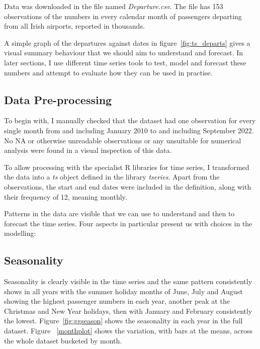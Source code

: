 \documentclass[9pt,technote]{IEEEtran}
\begin{document}
Data was downloaded in the file named \textit{Departure.csv}.  The file has 153 observations of the numbers in every calendar month of passengers departing from all Irish airports, reported in thousands.  

A simple graph of the departures against dates in figure~\ref{fig:ts_departs} gives a visual summary behaviour that we should aim to understand and forecast. In later sections, I use different time series tools to test, model and forecast these numbers and attempt to evaluate how they can be used in practise.  

\subsection{Data Pre-processing}

To begin with, I manually checked that the dataset had one observation for every single month from and including January 2010 to and including September 2022.  No NA or otherwise unreadable observations or any unsuitable for numerical analysis were found in a visual inspection of this data. 

To allow processing with the specialist R libraries for time series, I transformed the data into a \textit{ts} object defined in the library \textit{tseries}.  Apart from the observations, the start and end dates were included in the definition, along with their frequency of 12, meaning monthly.  


Patterns in the data are visible that we can use to understand and then to forecast the time series.  Four aspects in particular present us with choices in the modelling:

\subsection{Seasonality}Seasonality is clearly visible in the time series and the same pattern consistently shows in all years with the summer holiday months of June, July and August showing the highest passenger numbers in each year, another peak at the Christmas and New Year holidays, then with January and February consistently the lowest.  Figure~\ref{fig:ggseason} shows the seasonality in each year in the full dataset.  Figure ~\ref{monthplot} shows the variation, with bars at the means, across the whole dataset bucketed by month.  
\end{document}
